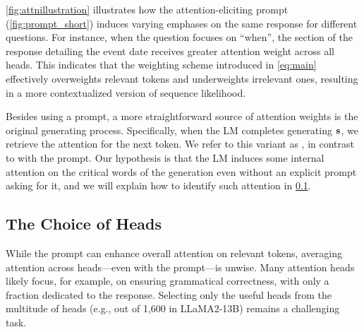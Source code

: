 \cref{fig:attnillustration} illustrates how the attention-eliciting prompt (\cref{fig:prompt_short}) induces varying emphases on the same response for different questions.
For instance, when the question focuses on ``when'', the section of the response detailing the event date receives greater attention weight across all heads. 
This indicates that the weighting scheme introduced in \cref{eq:main} effectively overweights relevant tokens and underweights irrelevant ones, resulting in a more contextualized version of sequence likelihood. %

Besides using a prompt, a more straightforward source of attention weights is the original generating process.
Specifically, when the LM completes generating $\mathbf{s}$, we retrieve the attention for the next token.
We refer to this variant as \methodnameNext, in contrast to \methodnamePrompt with the prompt. 
Our hypothesis is that the LM induces some internal attention on the critical words of the generation even without an explicit prompt asking for it, and we will explain how to identify such attention in \cref{sec:method:headchoice}.





\subsection{The Choice of Heads}\label{sec:method:headchoice}

While the prompt can enhance overall attention on relevant tokens, averaging attention across heads---even with the prompt---is unwise. 
Many attention heads likely focus, for example, on ensuring grammatical correctness, with only a fraction dedicated to the response. 
Selecting only the useful heads from the multitude of heads (e.g., out of 1,600 in LLaMA2-13B) remains a challenging task.



